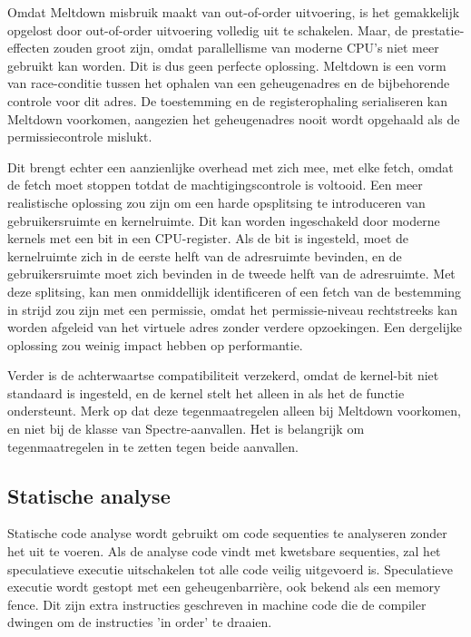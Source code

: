Omdat Meltdown misbruik maakt van out-of-order uitvoering, is het gemakkelijk opgelost
door out-of-order uitvoering volledig uit te schakelen. Maar, de prestatie-effecten
zouden groot zijn, omdat parallellisme van moderne CPU's
niet meer gebruikt kan worden. Dit is dus geen perfecte
oplossing.
Meltdown is een vorm van race-conditie tussen het
ophalen van een geheugenadres en de bijbehorende controle voor dit adres. De toestemming en de registerophaling serialiseren
kan Meltdown voorkomen,
aangezien het geheugenadres nooit wordt opgehaald als de permissiecontrole mislukt.




Dit brengt echter een aanzienlijke overhead met zich mee,
met elke fetch, omdat de fetch moet stoppen
totdat de machtigingscontrole is voltooid.
Een meer realistische oplossing zou zijn om een harde opsplitsing te introduceren
van gebruikersruimte en kernelruimte. Dit kan worden ingeschakeld door moderne kernels met een
bit in een CPU-register. Als de
bit is ingesteld, moet de kernelruimte zich in de eerste helft 
van de adresruimte bevinden, en de gebruikersruimte moet zich bevinden in 
de tweede helft van de adresruimte. Met deze splitsing, kan men onmiddellijk identificeren of een
fetch van de bestemming in strijd zou zijn met een permissie,
omdat het permissie-niveau rechtstreeks kan worden afgeleid van
het virtuele adres zonder verdere opzoekingen. Een dergelijke oplossing zou weinig impact hebben op performantie.

Verder is de achterwaartse compatibiliteit
verzekerd, omdat de kernel-bit niet standaard is ingesteld, en
de kernel stelt het alleen in als het de functie ondersteunt.
Merk op dat deze tegenmaatregelen alleen bij Meltdown voorkomen,
en niet bij de klasse van Spectre-aanvallen. 
Het is belangrijk om tegenmaatregelen in te zetten
tegen beide aanvallen.




\subsection{Statische analyse}
Statische code analyse wordt gebruikt om code sequenties te analyseren zonder het uit te voeren. Als de analyse code vindt met kwetsbare sequenties, zal het speculatieve executie uitschakelen tot alle code veilig uitgevoerd is.
Speculatieve executie wordt gestopt met een geheugenbarrière, ook bekend als een memory fence. Dit zijn extra instructies geschreven in machine code die de compiler dwingen om de instructies 'in order' te draaien.


